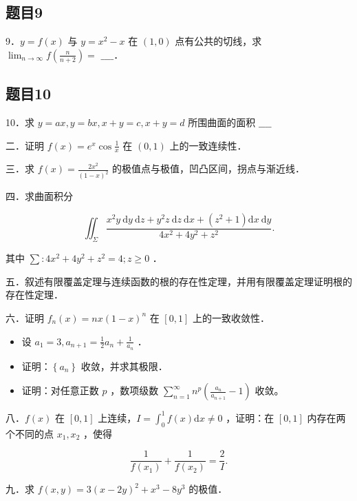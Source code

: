 \documentclass{article}
\begin{document}
\subsection{题目9}
9．\(y=f(x)\) 与 \(y=x^{2}-x\) 在 \((1,0)\) 点有公共的切线，求 \(\lim _{n \rightarrow \infty} f\left(\frac{n}{n+2}\right)=\) \(\_\_\_\_\)．

\subsection{题目10}
10．求 \(y=a x, y=b x, x+y=c, x+y=d\) 所围曲面的面积 \(\_\_\_\_\)

二．证明 \(f(x)=e^{x} \cos \frac{1}{x}\) 在 \((0,1)\) 上的一致连续性．

三．求 \(f(x)=\frac{2 x^{2}}{(1-x)^{2}}\) 的极值点与极值，凹凸区间，拐点与渐近线．

四．求曲面积分

\[
\iint_{\Sigma} \frac{x^{2} y \mathrm{~d} y \mathrm{~d} z+y^{2} z \mathrm{~d} z \mathrm{~d} x+\left(z^{2}+1\right) \mathrm{d} x \mathrm{~d} y}{4 x^{2}+4 y^{2}+z^{2}} .
\]

其中 \(\sum: 4 x^{2}+4 y^{2}+z^{2}=4 ; z \geq 0\) ．

五．叙述有限覆盖定理与连续函数的根的存在性定理，并用有限覆盖定理证明根的存在性定理．

六．证明 \(f_{n}(x)=n x(1-x)^{n}\) 在 \([0,1]\) 上的一致收敛性．

\begin{itemize}
  \item[七．] 设 \(a_{1}=3, a_{n+1}=\frac{1}{2} a_{n}+\frac{1}{a_{n}}\) ．
  \item[（1）] 证明：\(\left\{a_{n}\right\}\) 收敛，并求其极限．
  \item[（2）] 证明：对任意正数 \(p\) ，数项级数 \(\sum_{n=1}^{\infty} n^{p}\left(\frac{a_{n}}{a_{n+1}}-1\right)\) 收敛。
\end{itemize}

八．\(f(x)\) 在 \([0,1]\) 上连续，\(I=\int_{0}^{1} f(x) \mathrm{d} x \neq 0\) ，证明：在 \([0,1]\) 内存在两个不同的点 \(x_{1}, x_{2}\) ，使得

\[
\frac{1}{f\left(x_{1}\right)}+\frac{1}{f\left(x_{2}\right)}=\frac{2}{I} .
\]

九．求 \(f(x, y)=3(x-2 y)^{2}+x^{3}-8 y^{3}\) 的极值．
\end{document}
